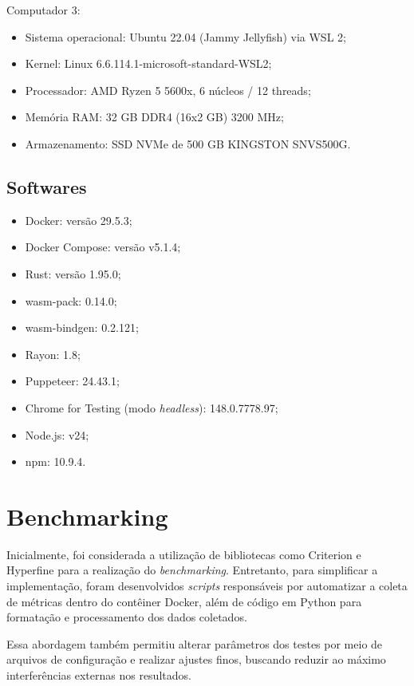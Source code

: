 Computador 3:

\begin{itemize}
    \item Sistema operacional: Ubuntu 22.04 (Jammy Jellyfish) via WSL 2;
    \item Kernel: Linux 6.6.114.1-microsoft-standard-WSL2;
    \item Processador: AMD Ryzen 5 5600x, 6 núcleos / 12 threads;
    \item Memória RAM: 32 GB DDR4 (16x2 GB) 3200 MHz;
    \item Armazenamento: SSD NVMe de 500 GB KINGSTON SNVS500G.
\end{itemize}

\subsection{Softwares}

\begin{itemize}
    \item Docker: versão 29.5.3;
    \item Docker Compose: versão v5.1.4;
    \item Rust: versão 1.95.0;
    \item wasm-pack: 0.14.0;
    \item wasm-bindgen: 0.2.121;
	\item Rayon: 1.8;
	\item Puppeteer: 24.43.1;
	\item Chrome for Testing (modo \emph{headless}): 148.0.7778.97;
	\item Node.js: v24;
	\item npm: 10.9.4.
\end{itemize}

\section{Benchmarking}

Inicialmente, foi considerada a utilização de bibliotecas como Criterion e Hyperfine para a realização do \emph{benchmarking}. Entretanto, para simplificar a implementação, foram desenvolvidos \emph{scripts} responsáveis por automatizar a coleta de métricas dentro do contêiner Docker, além de código em Python para formatação e processamento dos dados coletados.

Essa abordagem também permitiu alterar parâmetros dos testes por meio de arquivos de configuração e realizar ajustes finos, buscando reduzir ao máximo interferências externas nos resultados.

